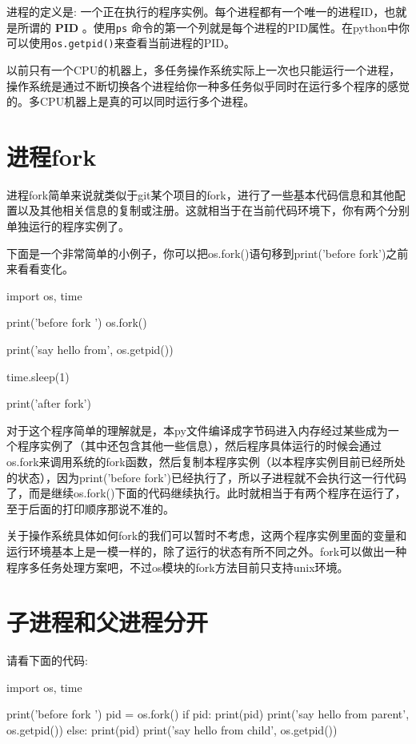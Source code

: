 \documentclass[12pt,oneside]{book}
\begin{document}
\begin{common-format}
进程的定义是: 一个正在执行的程序实例。每个进程都有一个唯一的进程ID，也就是所谓的 \textbf{PID} 。使用\verb+ps+ 命令的第一个列就是每个进程的PID属性。在python中你可以使用\verb+os.getpid()+来查看当前进程的PID。

以前只有一个CPU的机器上，多任务操作系统实际上一次也只能运行一个进程，操作系统是通过不断切换各个进程给你一种多任务似乎同时在运行多个程序的感觉的。多CPU机器上是真的可以同时运行多个进程。

\section{进程fork}
进程fork简单来说就类似于git某个项目的fork，进行了一些基本代码信息和其他配置以及其他相关信息的复制或注册。这就相当于在当前代码环境下，你有两个分别单独运行的程序实例了。

下面是一个非常简单的小例子，你可以把os.fork()语句移到print('before fork')之前来看看变化。

\begin{tcbpython}[]
import os, time

print('before fork ')
os.fork()

print('say hello from', os.getpid())

time.sleep(1)

print('after fork')
\end{tcbpython}

对于这个程序简单的理解就是，本py文件编译成字节码进入内存经过某些成为一个程序实例了（其中还包含其他一些信息），然后程序具体运行的时候会通过os.fork来调用系统的fork函数，然后复制本程序实例（以本程序实例目前已经所处的状态），因为print('before fork')已经执行了，所以子进程就不会执行这一行代码了，而是继续os.fork()下面的代码继续执行。此时就相当于有两个程序在运行了，至于后面的打印顺序那说不准的。

关于操作系统具体如何fork的我们可以暂时不考虑，这两个程序实例里面的变量和运行环境基本上是一模一样的，除了运行的状态有所不同之外。fork可以做出一种程序多任务处理方案吧，不过os模块的fork方法目前只支持unix环境。

\section{子进程和父进程分开}
请看下面的代码: 

\begin{tcbpython}[]
import os, time

print('before fork ')
pid = os.fork()
if pid:
    print(pid)
    print('say hello from parent', os.getpid())
else:
    print(pid)
    print('say hello from child', os.getpid())


\end{tcbpython}
\end{common-format}
\end{document}
